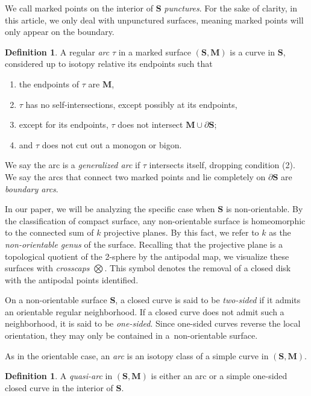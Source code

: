 \documentclass[10pt,a4paper]{amsart}
\numberwithin{equation}{section}
\theoremstyle{definition}
\newtheorem{Definition}[Theorem]{Definition}
\newcommand{\SM}{(\mathbf{S}, \mathbf{M})}
\begin{document}
We call marked points on the interior of $\mathbf{S}$ \textit{punctures}. For the sake of clarity, in this article, we only deal with unpunctured surfaces, meaning marked points will only appear on the boundary.

\begin{Definition}\label{definition::regulararc}
A regular \textit{arc} $\tau$ in a marked surface $\SM$ is a curve in $\mathbf{S}$, considered up to isotopy relative its endpoints such that
\begin{enumerate}\itemsep=0pt
 \item[(1)] the endpoints of $\tau$ are $\mathbf{M}$,
 \item[(2)] $\tau$ has no self-intersections, except possibly at its endpoints,
 \item[(3)] except for its endpoints, $\tau$ does not intersect $\mathbf{M} \cup \partial \mathbf{S}$;
 \item[(4)] and $\tau$ does not cut out a monogon or bigon.
\end{enumerate}
We say the arc is a \textit{generalized arc} if $\tau$ intersects itself, dropping condition (2). We say the arcs that connect two marked points and lie completely on $\partial \mathbf{S}$ are \textit{boundary arcs}.
\end{Definition}

In our paper, we will be analyzing the specific case when $\mathbf{S}$ is non-orientable. By the classification of compact surface, any non-orientable surface is homeomorphic to the connected sum of $k$ projective planes. By this fact, we refer to $k$ as the \textit{non-orientable genus} of the surface. Recalling that the projective plane is a topological quotient of the 2-sphere by the antipodal map, we visualize these surfaces with \textit{crosscaps} $\bigotimes$. This symbol denotes the removal of a closed disk with the antipodal points identified.

On a non-orientable surface $\mathbf{S}$, a closed curve is said to be \textit{two-sided} if it admits an orientable regular neighborhood. If a closed curve does not admit such a neighborhood, it is said to be \textit{one-sided}. Since one-sided curves reverse the local orientation, they may only be contained in a~non-orientable surface.

As in the orientable case, an \textit{arc} is an isotopy class of a simple curve in $(\mathbf{S},\mathbf{M})$.

\begin{Definition}\label{definition:quasiarc}
 A \textit{quasi-arc} in $(\mathbf{S},\mathbf{M})$ is either an arc or a simple one-sided closed curve in the interior of $\mathbf{S}$.
\end{Definition}
\end{document}
